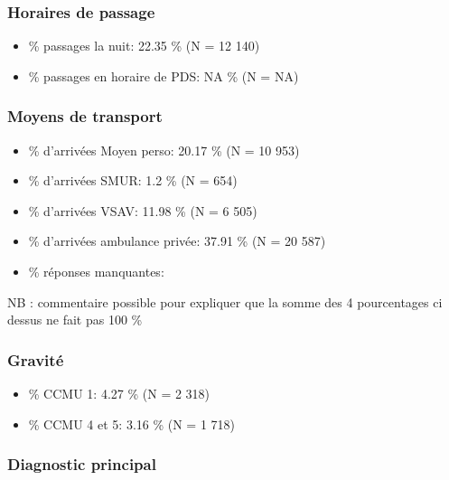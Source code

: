 \documentclass[]{article}
\begin{document}
\subsubsection{Horaires de passage}\label{horaires-de-passage-1}

\begin{itemize}
\itemsep1pt\parskip0pt
\item
  \% passages la nuit: 22.35 \% (N = 12 140)
\item
  \% passages en horaire de PDS: NA \% (N = NA)
\end{itemize}

\subsubsection{Moyens de transport}\label{moyens-de-transport}

\begin{itemize}
\itemsep1pt\parskip0pt
\item
  \% d'arrivées Moyen perso: 20.17 \% (N = 10 953)
\item
  \% d'arrivées SMUR: 1.2 \% (N = 654)
\item
  \% d'arrivées VSAV: 11.98 \% (N = 6 505)
\item
  \% d'arrivées ambulance privée: 37.91 \% (N = 20 587)
\item
  \% réponses manquantes:
\end{itemize}

NB : commentaire possible pour expliquer que la somme des 4 pourcentages
ci dessus ne fait pas 100 \%

\subsubsection{Gravité}\label{gravite}

\begin{itemize}
\itemsep1pt\parskip0pt
\item
  \% CCMU 1: 4.27 \% (N = 2 318)
\item
  \% CCMU 4 et 5: 3.16 \% (N = 1 718)
\end{itemize}

\subsubsection{Diagnostic principal}\label{diagnostic-principal}
\end{document}

